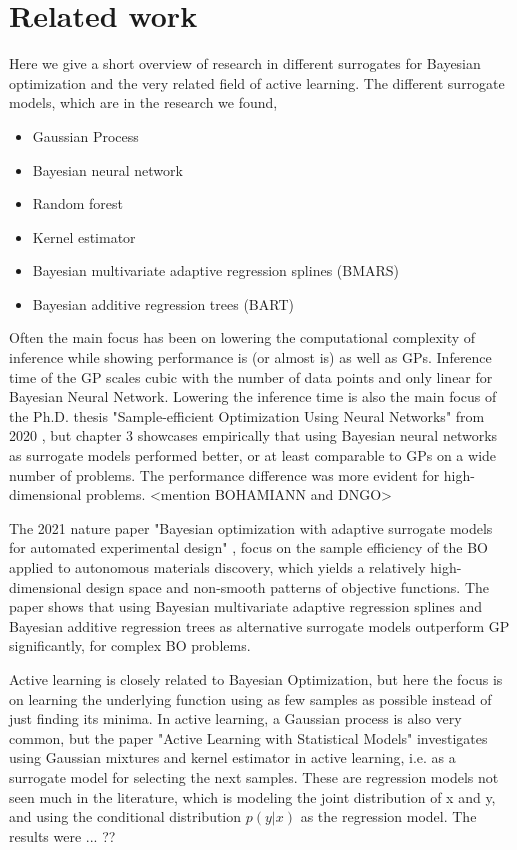 \section{Related work}
Here we give a short overview of research in different surrogates for Bayesian optimization
and the very related field of active learning. The different surrogate models, which are in the 
research we found, 
\begin{itemize}[noitemsep]
    \item Gaussian Process
    \item Bayesian neural network
    \item Random forest
    \item Kernel estimator
    \item Bayesian multivariate adaptive regression splines (BMARS)
    \item Bayesian additive regression trees (BART)
\end{itemize}

Often the main focus has been on lowering the computational complexity of inference while
showing performance is (or almost is) as well as GPs. Inference time of the GP scales cubic with the
number of data points and only linear for Bayesian Neural Network. Lowering the inference time is also the
main focus of the Ph.D. thesis "Sample-efficient Optimization Using Neural Networks" from 2020
\cite{PhDthesis}, but chapter 3 showcases empirically that using Bayesian neural networks as
surrogate models performed better, or at least comparable to GPs on a wide number of
problems. The performance difference was more evident for high-dimensional problems. 
<mention BOHAMIANN and DNGO>

The 2021 nature paper "Bayesian optimization with adaptive surrogate models for automated experimental design"
\cite{Nature_BO_paper}, focus on the sample efficiency of the BO applied to autonomous materials discovery, 
which yields a relatively high-dimensional design space and non-smooth patterns of objective functions.  
The paper shows that using Bayesian multivariate adaptive regression splines
and Bayesian additive regression trees as alternative surrogate models outperform GP significantly, 
for complex BO problems. 

Active learning is closely related to Bayesian Optimization, but here the focus is on learning the underlying function
using as few samples as possible instead of just finding its minima. 
In active learning, a Gaussian process is also very common, but the paper "Active Learning with Statistical Models" \cite{ALStatisticalModels}
investigates using Gaussian mixtures and kernel estimator in active learning, i.e. as a surrogate model for selecting
the next samples. These are regression models not seen much in the literature, which
is modeling the joint distribution of x and y, and using the conditional distribution $p(y|x)$
as the regression model. The results were ... ??

